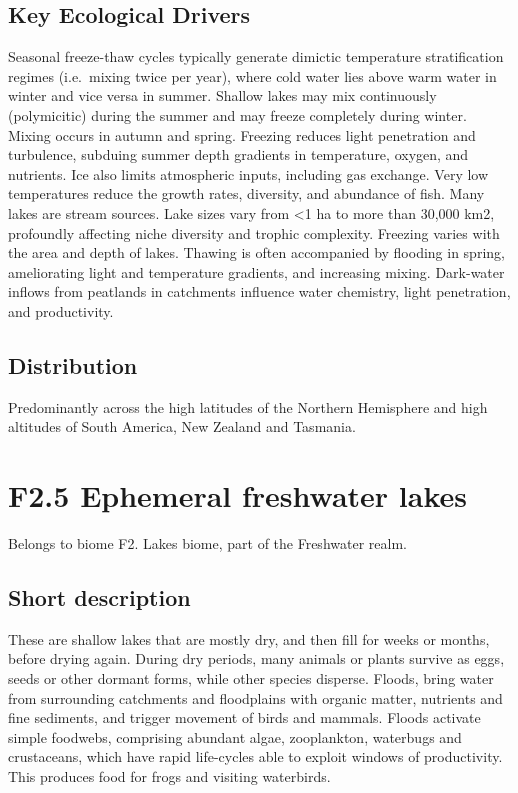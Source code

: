 \documentclass[
  letterpaper,
  DIV=11,
  numbers=noendperiod]{scrartcl}
\begin{document}
\subsection{Key Ecological Drivers}\label{key-ecological-drivers-120}

Seasonal freeze-thaw cycles typically generate dimictic temperature
stratification regimes (i.e.~mixing twice per year), where cold water
lies above warm water in winter and vice versa in summer. Shallow lakes
may mix continuously (polymicitic) during the summer and may freeze
completely during winter. Mixing occurs in autumn and spring. Freezing
reduces light penetration and turbulence, subduing summer depth
gradients in temperature, oxygen, and nutrients. Ice also limits
atmospheric inputs, including gas exchange. Very low temperatures reduce
the growth rates, diversity, and abundance of fish. Many lakes are
stream sources. Lake sizes vary from \textless1 ha to more than 30,000
km2, profoundly affecting niche diversity and trophic complexity.
Freezing varies with the area and depth of lakes. Thawing is often
accompanied by flooding in spring, ameliorating light and temperature
gradients, and increasing mixing. Dark-water inflows from peatlands in
catchments influence water chemistry, light penetration, and
productivity.

\subsection{Distribution}\label{distribution-120}

Predominantly across the high latitudes of the Northern Hemisphere and
high altitudes of South America, New Zealand and Tasmania.

\section{F2.5 Ephemeral freshwater
lakes}\label{f2.5-ephemeral-freshwater-lakes-1}

Belongs to biome F2. Lakes biome, part of the Freshwater realm.

\subsection{Short description}\label{short-description-121}

These are shallow lakes that are mostly dry, and then fill for weeks or
months, before drying again. During dry periods, many animals or plants
survive as eggs, seeds or other dormant forms, while other species
disperse. Floods, bring water from surrounding catchments and
floodplains with organic matter, nutrients and fine sediments, and
trigger movement of birds and mammals. Floods activate simple foodwebs,
comprising abundant algae, zooplankton, waterbugs and crustaceans, which
have rapid life-cycles able to exploit windows of productivity. This
produces food for frogs and visiting waterbirds.
\end{document}
